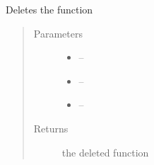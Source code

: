\documentclass[letterpaper,10pt,english]{sphinxmanual}
\begin{document}
\begin{fulllineitems}
\label{_source/son_editor.impl:son_editor.impl.functionsimpl.delete_function}
Deletes the function
\begin{quote}\begin{description}
\item[{Parameters}] \leavevmode\begin{itemize}
\item {} 
 -- 

\item {} 
 -- 

\item {} 
 -- 

\end{itemize}

\item[{Returns}] \leavevmode
the deleted function

\end{description}\end{quote}

\end{fulllineitems}


\begin{fulllineitems}
\label{_source/son_editor.impl:son_editor.impl.functionsimpl.delete_image_file}
\end{fulllineitems}

\end{document}
